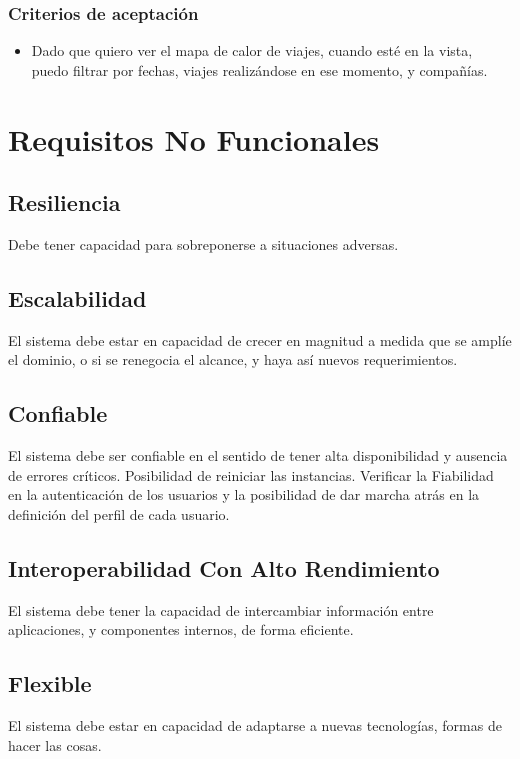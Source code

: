 \documentclass{article}
\begin{document}
\subsubsection{Criterios de aceptación}
\begin{itemize}
    \item Dado que quiero ver el mapa de calor de viajes, cuando esté en la vista, puedo filtrar por fechas, viajes realizándose en ese momento, y compañías.
\end{itemize}

\section{Requisitos No Funcionales}

\subsection{Resiliencia}
Debe tener capacidad para sobreponerse a situaciones adversas.

\subsection{Escalabilidad}
El sistema debe estar en capacidad de crecer en magnitud a medida que se amplíe el dominio, o si se renegocia el alcance, y haya así nuevos requerimientos.

\subsection{Confiable}
El sistema debe ser confiable en el sentido de tener alta disponibilidad y ausencia de errores críticos. Posibilidad de reiniciar las instancias. Verificar la Fiabilidad en la autenticación de los usuarios y la posibilidad de dar marcha atrás en la definición del perfil de cada usuario.

\subsection{Interoperabilidad Con Alto Rendimiento}
El sistema debe tener la capacidad de intercambiar información entre aplicaciones, y componentes internos, de forma eficiente.

\subsection{Flexible}
El sistema debe estar en capacidad de adaptarse a nuevas tecnologías, formas de hacer las cosas.
\end{document}
